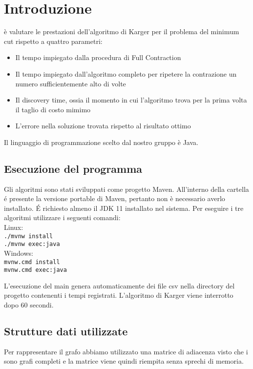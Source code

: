 \section{Introduzione}

è valutare le prestazioni dell'algoritmo di Karger per il problema del minimum cut rispetto a quattro parametri:
\begin{itemize}
\item Il tempo impiegato dalla procedura di Full Contraction
\item Il tempo impiegato dall'algoritmo completo per ripetere la contrazione un numero sufficientemente alto di volte
\item Il discovery time, ossia il momento in cui l'algoritmo trova per la prima volta il taglio di costo mimimo
\item L'errore nella soluzione trovata rispetto al risultato ottimo
\end{itemize}
Il linguaggio di programmazione scelto dal nostro gruppo è Java.

\subsection{Esecuzione del programma}
Gli algoritmi sono stati sviluppati come progetto Maven. All'interno della cartella \'e presente la versione portable di Maven, pertanto non è necessario averlo installato. \'E
richiesto almeno il JDK 11 installato nel sistema.
Per eseguire i tre algoritmi utilizzare i seguenti comandi:\\
Linux:\\
\indent \texttt{./mvnw install}\\
\indent \texttt{./mvnw exec:java}\\
Windows:\\
\indent \texttt{mvnw.cmd install}\\
\indent \texttt{mvnw.cmd exec:java}

L'esecuzione del main genera automaticamente dei file csv nella directory del progetto contenenti i tempi registrati. L'algoritmo di Karger viene interrotto dopo 60 secondi.
\subsection{Strutture dati utilizzate}

Per rappresentare il grafo abbiamo utilizzato una matrice di adiacenza visto che i sono grafi completi e la matrice viene quindi riempita senza sprechi di memoria.

